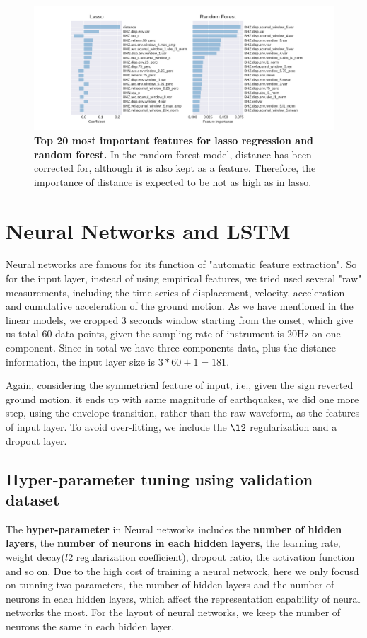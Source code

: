 \documentclass{article} %
\begin{document}
\begin{figure}[ht!]
	\centering
	\includegraphics*[scale=0.5, viewport= 12mm 0mm 500mm 120mm, angle=0]{./figure/Feature_importance_lasso_RF.pdf}
	\caption{{\bf Top 20 most important features for lasso regression and random forest.} In the random forest model, distance has been corrected for, although it is also kept as a feature. Therefore, the importance of distance is expected to be not as high as in lasso.}\label{Feature_importance_lasso_RF} 
\end{figure}


\section{Neural Networks and LSTM}
Neural networks are famous for its function of "automatic feature extraction". So for the input layer, instead of using empirical features, we tried used several "raw" measurements, including the time series of displacement, velocity, acceleration and cumulative acceleration of the ground motion. As we have mentioned in the linear models, we cropped 3 seconds window starting from the onset, which give us total 60 data points, given the sampling rate of instrument is 20Hz on one component. Since in total we have three components data, plus the distance information, the input layer size is $3*60 + 1 = 181$. 

Again, considering the symmetrical feature of input, i.e., given the sign reverted ground motion, it ends up with same magnitude of earthquakes, we did one more step, using the envelope transition, rather than the raw waveform, as the features of input layer. To avoid over-fitting, we include the $\l2$ regularization and a dropout layer.

\subsection{Hyper-parameter tuning using validation dataset}
The \textbf{hyper-parameter} in Neural networks includes the \textbf{number of hidden layers}, the \textbf{number of neurons in each hidden layers}, the learning rate, weight decay($l2$ regularization coefficient), dropout ratio, the activation function and so on. Due to the high cost of training a neural network, here we only focusd on tunning two parameters, the number of hidden layers and the number of neurons in each hidden layers, which affect the representation capability of neural networks the most. For the layout of neural networks, we keep the number of neurons the same in each hidden layer.
\end{document}
